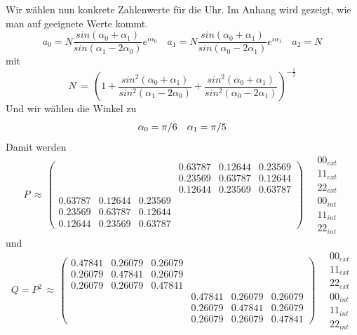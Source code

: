 \documentclass[12pt]{article}
\begin{document}
Wir wählen nun konkrete Zahlenwerte für die Uhr. Im Anhang wird gezeigt, wie man auf geeignete Werte kommt.
\begin{equation*}
a_0=N\frac{sin(\alpha_0+\alpha_1)}{sin(\alpha_1-2\alpha_0)}e^{i\alpha_0} \quad
a_1=N\frac{sin(\alpha_0+\alpha_1)}{sin(\alpha_0-2\alpha_1)}e^{i\alpha_1} \quad
a_2=N
\end{equation*}
mit 
\begin{equation*}
N\, = \, \left( 1 +
\frac{sin^2(\alpha_0+\alpha_1)}{sin^2(\alpha_1-2\alpha_0)} +
\frac{sin^2(\alpha_0+\alpha_1)}{sin^2(\alpha_0-2\alpha_1)} \right)^{-\frac{1}{2}}
\end{equation*}
Und wir wählen die Winkel zu
\begin{equation*}
\alpha_0 = \pi / 6 \quad \alpha_1 = \pi / 5 \\ \\
\end{equation*}
Damit werden 
\begin{equation*}
P\, \approx\,
\begin{pmatrix}
   &&& 0.63787 &  0.12644 &  0.23569 \\
   &&& 0.23569 &  0.63787 &  0.12644 \\
   &&& 0.12644 &  0.23569 &  0.63787 \\
   0.63787 &  0.12644 &  0.23569 &&& \\
   0.23569 &  0.63787 &  0.12644 &&& \\
   0.12644 &  0.23569 &  0.63787 &&& 
\end{pmatrix}
\quad
\begin{matrix}
00_{ext} \\ 11_{ext} \\ 22_{ext} \\ 00_{int} \\ 11_{int} \\ 22_{int}
\end{matrix}
\end{equation*}
und
\begin{equation*}
Q=P^2\, \approx\,
\begin{pmatrix}
   0.47841 & 0.26079 & 0.26079 &&& \\
   0.26079 & 0.47841 & 0.26079 &&& \\
   0.26079 & 0.26079 & 0.47841 &&& \\
   &&& 0.47841 & 0.26079 & 0.26079 \\
   &&& 0.26079 & 0.47841 & 0.26079 \\
   &&& 0.26079 & 0.26079 & 0.47841
\end{pmatrix}
\quad
\begin{matrix}
00_{ext} \\ 11_{ext} \\ 22_{ext} \\ 00_{int} \\ 11_{int} \\ 22_{int}
\end{matrix}
\end{equation*}
\end{document}
